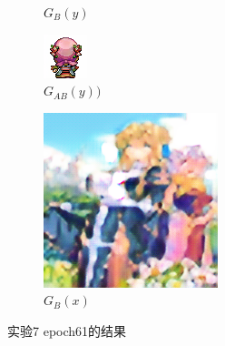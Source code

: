 \documentclass[twocolumn,11pt]{ctexart}
\begin{document}
\begin{figure}[htb]
\begin{subfigure}[b]{0.23\linewidth}
        \caption{$G_B(y)$}
      \end{subfigure}
      \begin{subfigure}[b]{0.23\linewidth}
        \includegraphics[width=\linewidth]{exp7_epoch061_rec_B.png}
        \caption{$G_{AB}(y))$}
      \end{subfigure}
      \begin{subfigure}[b]{0.23\linewidth}
        \includegraphics[width=\linewidth]{exp7_epoch061_idt_B.png}
        \caption{$G_B(x)$}
      \end{subfigure}
      \caption{实验7 epoch61的结果}
      \label{fig:exp7epoch61}
\end{figure}
\end{document}
